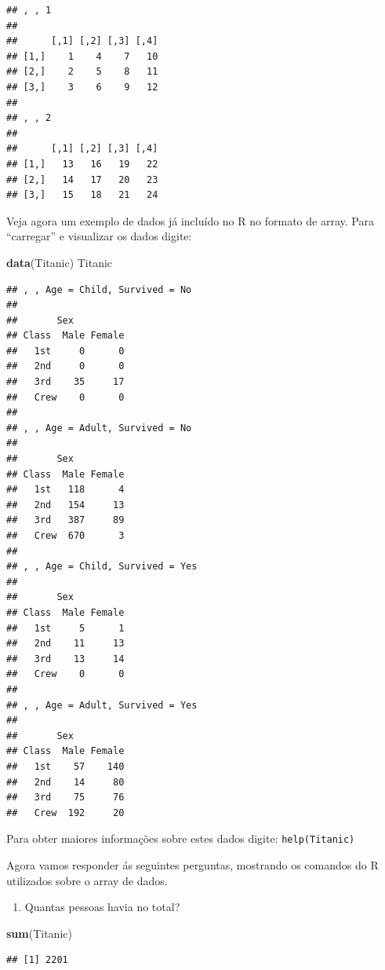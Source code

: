 \documentclass[
]{book}
\newenvironment{Shaded}{\begin{snugshade}}{\end{snugshade}}
\newcommand{\KeywordTok}[1]{\textcolor[rgb]{0.13,0.29,0.53}{\textbf{#1}}}
\newcommand{\NormalTok}[1]{#1}
\providecommand{\tightlist}{%
  \setlength{\itemsep}{0pt}\setlength{\parskip}{0pt}}
\begin{document}
\begin{verbatim}
## , , 1
## 
##      [,1] [,2] [,3] [,4]
## [1,]    1    4    7   10
## [2,]    2    5    8   11
## [3,]    3    6    9   12
## 
## , , 2
## 
##      [,1] [,2] [,3] [,4]
## [1,]   13   16   19   22
## [2,]   14   17   20   23
## [3,]   15   18   21   24
\end{verbatim}

Veja agora um exemplo de dados já incluído no R no formato de array. Para ``carregar'' e visualizar os dados digite:

\begin{Shaded}
\begin{Highlighting}[]
\KeywordTok{data}\NormalTok{(Titanic) }
\NormalTok{Titanic}
\end{Highlighting}
\end{Shaded}

\begin{verbatim}
## , , Age = Child, Survived = No
## 
##       Sex
## Class  Male Female
##   1st     0      0
##   2nd     0      0
##   3rd    35     17
##   Crew    0      0
## 
## , , Age = Adult, Survived = No
## 
##       Sex
## Class  Male Female
##   1st   118      4
##   2nd   154     13
##   3rd   387     89
##   Crew  670      3
## 
## , , Age = Child, Survived = Yes
## 
##       Sex
## Class  Male Female
##   1st     5      1
##   2nd    11     13
##   3rd    13     14
##   Crew    0      0
## 
## , , Age = Adult, Survived = Yes
## 
##       Sex
## Class  Male Female
##   1st    57    140
##   2nd    14     80
##   3rd    75     76
##   Crew  192     20
\end{verbatim}

Para obter maiores informações sobre estes dados digite: \texttt{help(Titanic)}

Agora vamos responder ás seguintes perguntas, mostrando os comandos do R utilizados sobre o array de dados.

\begin{enumerate}
\def\labelenumi{\arabic{enumi}.}
\tightlist
\item
  Quantas pessoas havia no total?
\end{enumerate}

\begin{Shaded}
\begin{Highlighting}[]
\KeywordTok{sum}\NormalTok{(Titanic)}
\end{Highlighting}
\end{Shaded}

\begin{verbatim}
## [1] 2201
\end{verbatim}
\end{document}
